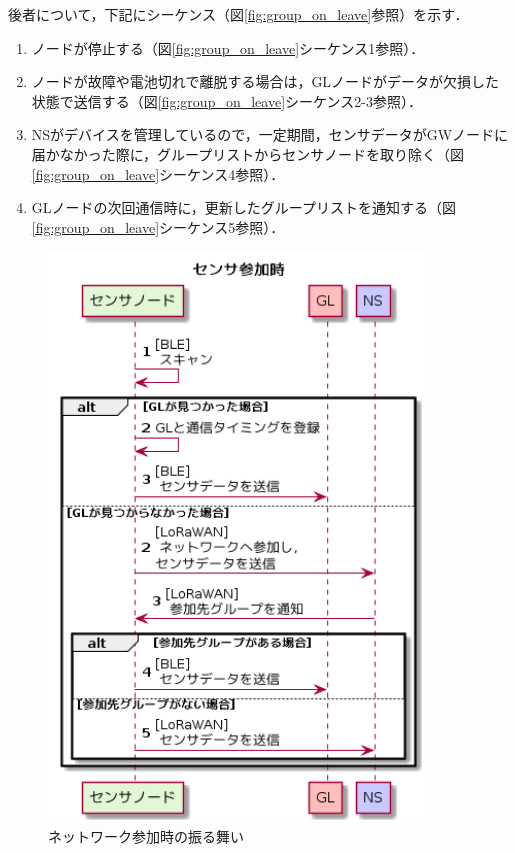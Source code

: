 後者について，下記にシーケンス（図\ref{fig:group_on_leave}参照）を示す．

\begin{enumerate}
    \item ノードが停止する（図\ref{fig:group_on_leave}シーケンス1参照）．
    \item ノードが故障や電池切れで離脱する場合は，GLノードがデータが欠損した状態で送信する（図\ref{fig:group_on_leave}シーケンス2-3参照）．
    \item NSがデバイスを管理しているので，一定期間，センサデータがGWノードに届かなかった際に，グループリストからセンサノードを取り除く（図\ref{fig:group_on_leave}シーケンス4参照）．
    \item GLノードの次回通信時に，更新したグループリストを通知する（図\ref{fig:group_on_leave}シーケンス5参照）．
\end{enumerate}

\begin{figure}[]
    \begin{center}
    \includegraphics[width=10cm]{figures/v2.0/センサ参加時.png}
    \caption{ネットワーク参加時の振る舞い}
    \label{fig:group_on_join}
    \end{center}
\end{figure}


